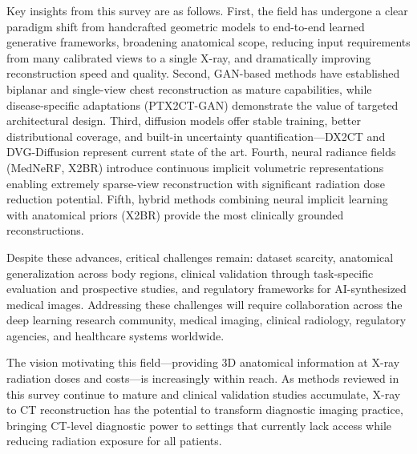 \documentclass[10pt,twocolumn,a4paper]{article}
\begin{document}
Key insights from this survey are as follows. First, the field has undergone a
clear paradigm shift from handcrafted geometric models to end-to-end learned
generative frameworks, broadening anatomical scope, reducing input requirements
from many calibrated views to a single X-ray, and dramatically improving
reconstruction speed and quality. Second, GAN-based methods have established
biplanar and single-view chest reconstruction as mature capabilities, while
disease-specific adaptations (PTX2CT-GAN) demonstrate the value of targeted
architectural design. Third, diffusion models offer stable training, better
distributional coverage, and built-in uncertainty quantification---DX2CT and
DVG-Diffusion represent current state of the art. Fourth, neural radiance fields
(MedNeRF, X2BR) introduce continuous implicit volumetric representations enabling
extremely sparse-view reconstruction with significant radiation dose reduction
potential. Fifth, hybrid methods combining neural implicit learning with
anatomical priors (X2BR) provide the most clinically grounded reconstructions.

Despite these advances, critical challenges remain: dataset scarcity, anatomical
generalization across body regions, clinical validation through task-specific
evaluation and prospective studies, and regulatory frameworks for AI-synthesized
medical images. Addressing these challenges will require collaboration across the
deep learning research community, medical imaging, clinical radiology, regulatory
agencies, and healthcare systems worldwide.

The vision motivating this field---providing 3D anatomical information at X-ray
radiation doses and costs---is increasingly within reach. As methods reviewed
in this survey continue to mature and clinical validation studies accumulate,
X-ray to CT reconstruction has the potential to transform diagnostic imaging
practice, bringing CT-level diagnostic power to settings that currently lack
access while reducing radiation exposure for all patients.


\end{document}
